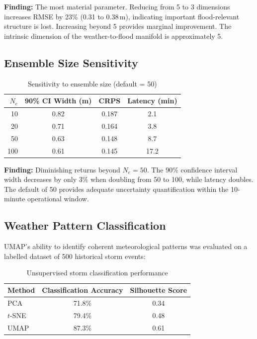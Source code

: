 \documentclass{article}
\begin{document}
\textbf{Finding:} The most material parameter. Reducing from 5 to 3 dimensions increases
RMSE by 23\% (0.31 to 0.38\,m), indicating important flood-relevant structure is lost.
Increasing beyond 5 provides marginal improvement. The intrinsic dimension of the
weather-to-flood manifold is approximately 5.

\subsection{Ensemble Size Sensitivity}

\begin{table}[H]
\centering
\begin{tabular}{rccc}
    \toprule
    $N_e$ & 90\% CI Width (m) & CRPS & Latency (min) \\
    \midrule
    10  & 0.82 & 0.187 & 2.1 \\
    20  & 0.71 & 0.164 & 3.8 \\
    50  & 0.63 & 0.148 & 8.7 \\
    100 & 0.61 & 0.145 & 17.2 \\
    \bottomrule
\end{tabular}
\caption{Sensitivity to ensemble size (default = 50)}
\label{tab:sens_ensemble}
\end{table}

\textbf{Finding:} Diminishing returns beyond $N_e = 50$. The 90\% confidence interval
width decreases by only 3\% when doubling from 50 to 100, while latency doubles.
The default of 50 provides adequate uncertainty quantification within the 10-minute
operational window.

\mkmvalidation

\subsection{Weather Pattern Classification}
UMAP's ability to identify coherent meteorological patterns was evaluated on a labelled
dataset of 500 historical storm events:

\begin{table}[H]
\centering
\begin{tabular}{lcc}
    \toprule
    \textbf{Method} & \textbf{Classification Accuracy} & \textbf{Silhouette Score} \\
    \midrule
    PCA                & 71.8\% & 0.34 \\
    $t$-SNE            & 79.4\% & 0.48 \\
    UMAP               & 87.3\% & 0.61 \\
    \bottomrule
\end{tabular}
\caption{Unsupervised storm classification performance}
\label{tab:classification}
\end{table}
\end{document}
